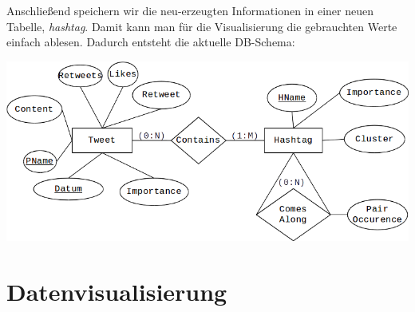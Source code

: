 \documentclass[paper=a4, english, ngerman, romanian]{scrartcl}
\begin{document}
		Anschließend speichern wir die neu-erzeugten Informationen in einer neuen Tabelle, \textit{hashtag}. Damit kann man für die Visualisierung die gebrauchten Werte einfach ablesen. Dadurch entsteht die aktuelle DB-Schema:
		
		\begin{center}
			\includegraphics[scale=0.6]{src/MinMax_Diagram}
		\end{center}
		
		\pagebreak

	\section{Datenvisualisierung}
	
\end{document}
